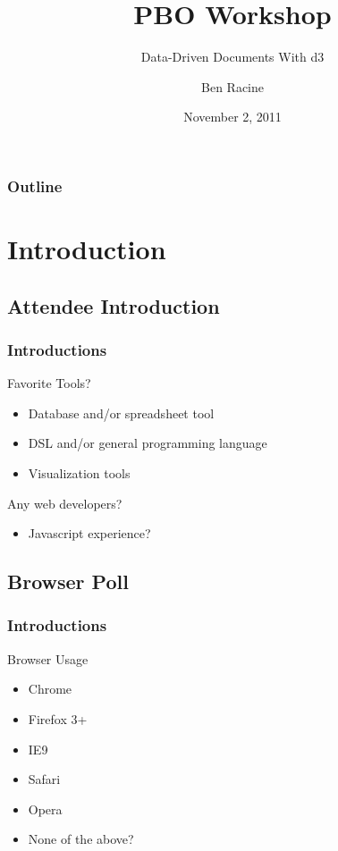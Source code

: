 \documentclass{beamer}
\title{PBO Workshop}
\subtitle{Data-Driven Documents With d3}
\author{Ben Racine \inst{1} }
\institute{\inst{1} Cornerstone Systems NW }
\date{November 2, 2011}
\begin{document}
\begin{frame}
    \frametitle{}
    \titlepage
\end{frame}

\begin{frame}
    \frametitle{Outline}
    \tableofcontents
\end{frame}

\section{Introduction}

\subsection{Attendee Introduction}

\begin{frame}
    \frametitle{Introductions}
    \begin{block}{Favorite Tools?}
        \pause
        \begin{itemize}
        \item Database and/or spreadsheet tool
        \item DSL and/or general programming language
        \item Visualization tools
        \end{itemize}
    \end{block}
    \pause
    \begin{block}{Any web developers?}
        \begin{itemize}
        \item Javascript experience?
        \end{itemize}
    \end{block}
\end{frame}


\subsection{Browser Poll}

\begin{frame}
    \frametitle{Introductions}
    \begin{block}{Browser Usage}
        \begin{itemize}
        \item Chrome
        \pause
        \item Firefox 3+
        \pause
        \item IE9
        \pause
        \item Safari
        \pause
        \item Opera
        \pause
        \item None of the above?
        \end{itemize}
    \end{block}
\end{frame}
\end{document}
